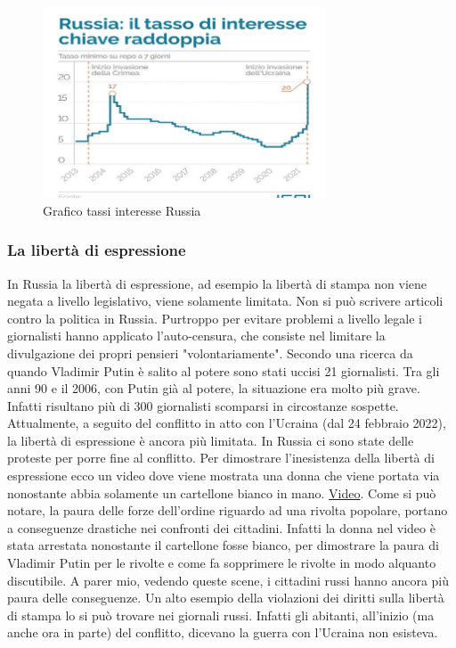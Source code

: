 \documentclass[a4paper, 12pt]{article}
\begin{document}
\begin{figure}[h]
    \centering
    \includegraphics[width=0.75\textwidth]{images/grafico_tassi_interesse_russia.jpeg}
    \caption{Grafico tassi interesse Russia}
\end{figure}



\pagebreak

\subsubsection{La libertà di espressione}

In Russia la libertà di espressione, ad esempio la libertà di stampa non viene negata a livello legislativo, viene solamente limitata. Non si può scrivere articoli contro la politica in Russia. Purtroppo per evitare problemi a livello legale i giornalisti hanno applicato l'auto-censura, che consiste nel limitare la divulgazione dei propri pensieri "volontariamente". Secondo una ricerca da quando Vladimir Putin è salito al potere sono stati uccisi 21 giornalisti. Tra gli anni 90 e il 2006, con Putin già al potere, la situazione era molto più grave. Infatti risultano più di 300 giornalisti scomparsi in circostanze sospette. Attualmente, a seguito del conflitto in atto con l'Ucraina (dal 24 febbraio 2022), la libertà di espressione è ancora più limitata. In Russia ci sono state delle proteste per porre fine al conflitto. Per dimostrare l'inesistenza della libertà di espressione ecco un video dove viene mostrata una donna che viene portata via nonostante abbia solamente un cartellone bianco in mano. \href{https://youtube.com/shorts/KzB5-r8un0k?feature=share}{Video}. Come si può notare, la paura delle forze dell'ordine riguardo ad una rivolta popolare, portano a conseguenze drastiche nei confronti dei cittadini. Infatti la donna nel video è stata arrestata nonostante il cartellone fosse bianco, per dimostrare la paura di Vladimir Putin per le rivolte e come fa sopprimere le rivolte in modo alquanto discutibile. A parer mio, vedendo queste scene, i cittadini russi hanno ancora più paura delle conseguenze. Un alto esempio della violazioni dei diritti sulla libertà di stampa lo si può trovare nei giornali russi. Infatti gli abitanti, all'inizio (ma anche ora in parte) del conflitto, dicevano la guerra con l'Ucraina non esisteva.
\end{document}
